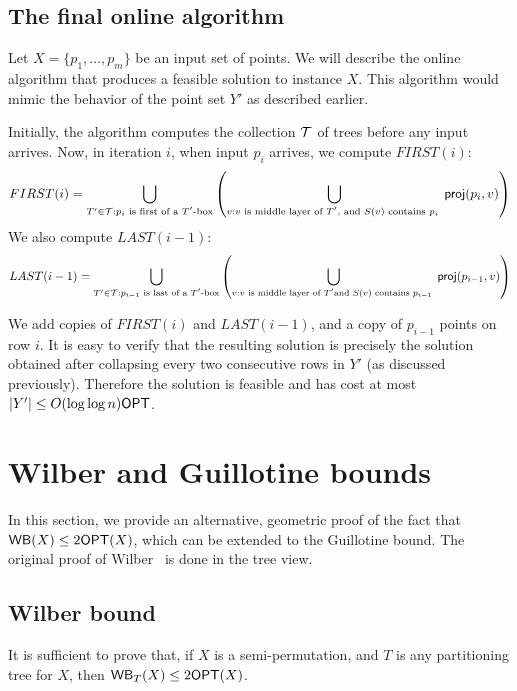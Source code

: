 \documentclass[11pt]{article}
\numberwithin{equation}{section}
\theoremstyle{definition}
\theoremstyle{plain}
\begin{document}
\fi

\subsection{The final online algorithm} \label{subsec: online final}
Let $X=\{p_1,\ldots, p_m\}$ be an input set of points. 
We will describe the online algorithm that produces a feasible solution to instance $X$. 
This algorithm would mimic the behavior of the point set $Y'$ as described earlier. 

Initially, the algorithm computes the collection ${\mathcal T}$ of trees before any input arrives. 
Now, in iteration $i$, when input $p_i$ arrives, we compute $FIRST(i)$: 
\[FIRST(i) = \bigcup_{T' \in {\mathcal T}: p_i \text{ is first of a $T'$-box}} \left( \bigcup_{v:\text{$v$ is middle layer of $T'$, and $S(v)$ contains $p_i$ }} {\sf proj}(p_i, v)\right) \] 
We also compute $LAST(i-1)$: 
\[LAST(i-1)= \bigcup_{T' \in {\mathcal T}: p_{i-1} \text{ is last of a $T'$-box}} \left( \bigcup_{v:\text{$v$ is middle layer of $T'$}\\ \text{and $S(v)$ contains $p_{i-1}$ }} {\sf proj}(p_{i-1}, v)\right)\]
%

We add copies of $FIRST(i)$ and $LAST(i-1)$, and a copy of $p_{i-1}$ points on row $i$. 
It is easy to verify that the resulting solution is precisely the solution obtained after collapsing every two consecutive rows in $Y'$ (as discussed previously). Therefore the solution is feasible and has cost at most $|Y'| \leq O(\log \log n) \mbox{\sf OPT}$.   



%

%
 
%
%
%
%
    
%
%

%

%

\section{Wilber and Guillotine bounds} 
\label{sec:direct WB LB}

In this section, we provide an alternative, geometric proof of the fact that $\mathsf{WB}(X) \leq 2 \mbox{\sf OPT}(X)$, which can be extended to the Guillotine bound. 
The original proof of Wilber~\cite{wilber} is done in the tree view. 
%

\subsection{Wilber bound} 
It is sufficient to prove that, if $X$ is a semi-permutation, and $T$ is any partitioning tree for $X$, then $\mathsf{WB}_T(X) \leq 2\mbox{\sf OPT}(X)$. %
\end{document}
